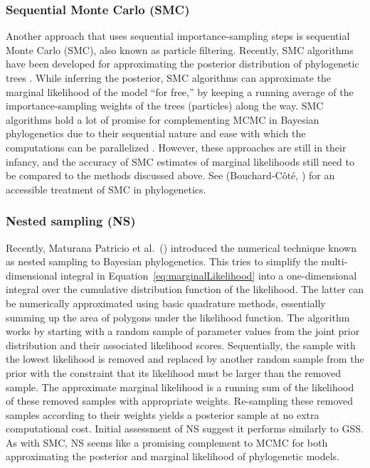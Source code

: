 \subsubsection{Sequential Monte Carlo (SMC)}
Another approach that uses sequential importance-sampling steps is sequential
Monte Carlo (SMC), also known as particle filtering.
Recently, SMC algorithms have been developed for approximating the posterior
distribution of phylogenetic trees \citep{Jordan2012,Bouchard2014}.
While inferring the posterior, SMC algorithms can approximate the marginal
likelihood of the model ``for free,'' by keeping a running average of the
importance-sampling weights of the trees (particles) along the way.
SMC algorithms hold a lot of promise for complementing MCMC in Bayesian
phylogenetics due to their sequential nature and ease with which the
computations can be parallelized
\citep{Jordan2012,Dinh2016preprint,Fourment2017preprint}.
However, these approaches are still in their infancy, and the accuracy of SMC
estimates of marginal likelihoods still need to be compared to the methods
discussed above.
See (Bouchard-C\^{o}t\'{e}, \citeyear{Bouchard2014}) for an accessible treatment
of SMC in phylogenetics.

\subsubsection{Nested sampling (NS)}
Recently, Maturana Patricio et al.\ (\citeyear{Maturana2017})
introduced the numerical technique known as nested sampling to Bayesian
phylogenetics.
This tries to simplify the multi-dimensional integral in
Equation~\ref{eq:marginalLikelihood}
into a one-dimensional integral over the cumulative distribution function
of the likelihood.
The latter can be numerically approximated using basic quadrature methods,
essentially summing up the area of polygons under the likelihood function.
The algorithm works by starting with a random sample of parameter values
from the joint prior distribution and their associated likelihood
scores.
Sequentially, the sample with the lowest likelihood is removed and replaced by
another random sample from the prior with the constraint that its likelihood
must be larger than the removed sample.
The approximate marginal likelihood is a running sum of the likelihood of these
removed samples with appropriate weights.
Re-sampling these removed samples according to their weights yields a posterior
sample at no extra computational cost.
Initial assessment of NS suggest it performs similarly to GSS.
As with SMC, NS seems like a promising complement to MCMC for both
approximating the posterior and marginal likelihood of phylogenetic models.


